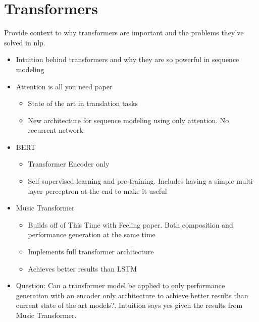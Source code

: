 \section{Transformers}
Provide context to why transformers are important and the problems they've solved in nlp. 
\begin{itemize}
    \item Intuition behind transformers and why they are so powerful in sequence modeling
    \item Attention is all you need paper \cite{vaswani2017attention}
    \begin{itemize}
        \item State of the art in translation tasks
        \item New architecture for sequence modeling using only attention. No recurrent network
    \end{itemize}
    \item BERT \cite{devlin2018bert}
    \begin{itemize}
        \item Transformer Encoder only 
        \item Self-supervised learning and pre-training. Includes having a simple multi-layer perceptron at the end to make it useful
    \end{itemize}
    \item Music Transformer \cite{huang2018music}
    \begin{itemize}
        \item Builds off of This Time with Feeling\cite{oore2020time} paper. Both composition and performance generation at the same time 
        \item Implements full transformer architecture 
        \item Achieves better results than LSTM
    \end{itemize}
    \item Question: Can a transformer model be applied to only performance generation with an encoder only architecture to achieve better results than current state of the art models?. Intuition says yes given the results from Music Transformer. 
\end{itemize}

